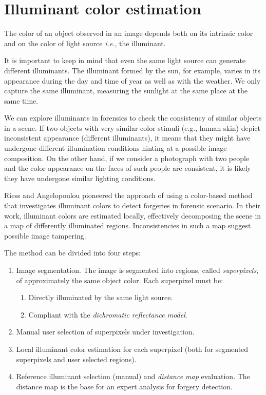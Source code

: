 \section{Illuminant color estimation}


The color of an object observed in an image depends both on its intrinsic color and on the color of light source \emph{i.e.}, the illuminant. 

It is important to keep in mind that even the same light source can generate different illuminants. The illuminant formed by the sun, for example, varies in its appearance during the day and time of year as well as with the weather. We only capture the same illuminant, measuring the sunlight at the same place at the same time.

We can explore illuminants in forensics to check the consistency of similar objects in a scene. If two objects with very similar color stimuli (e.g., human skin) depict inconsistent appearance (different illuminants), it means  that they might have undergone different illumination conditions hinting at a possible image composition. On the other hand, if we consider a photograph with two people and the color appearance on the faces of such people are consistent, it is likely they have undergone similar lighting conditions.

Riess and Angelopoulou\cite{riess2010scene} pioneered the approach of using a color-based method that investigates illuminant colors to detect forgeries in forensic scenario. In their work, illuminant colors are estimated locally, effectively decomposing the scene in a map of differently illuminated regions. Inconsistencies in such a map suggest possible image tampering.

The method can be divided into four steps:

\begin{enumerate}
\item Image segmentation. The image is segmented into regions, called \emph{superpixels}, of approximately the same object color. Each superpixel must be:
\begin{enumerate}
\item Directly illuminated by the same light source.
\item Compliant with the \emph{dichromatic reflectance model}\cite{tan2004color}.
\end{enumerate}
\item Manual user selection of superpixels under investigation.
\item Local illuminant color estimation for each superpixel (both for segmented superpixels and user selected regions).
\item Reference illuminant selection (manual) and \emph{distance map} evaluation. The distance map is the base for an expert analysis for forgery detection.
\end{enumerate}


